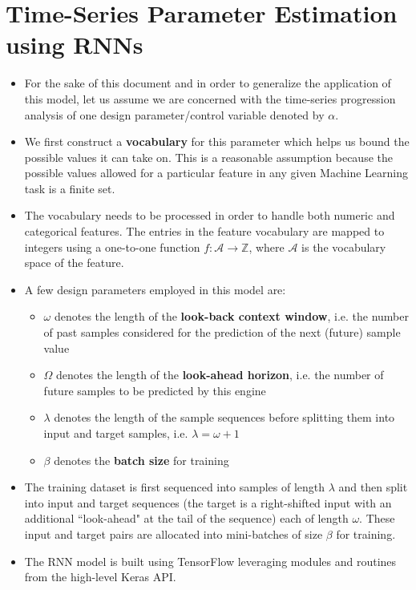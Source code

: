 \documentclass{article}
\begin{document}
\section{Time-Series Parameter Estimation using RNNs}
\begin{itemize}
    \item For the sake of this document and in order to generalize the application of this model, let us assume we are concerned with the time-series progression analysis of one design parameter/control variable denoted by $\alpha$.
    \item We first construct a \textbf{vocabulary} for this parameter which helps us bound the possible values it can take on. This is a reasonable assumption because the possible values allowed for a particular feature in any given Machine Learning task is a finite set.
    \item The vocabulary needs to be processed in order to handle both numeric and categorical features. The entries in the feature vocabulary are mapped to integers using a one-to-one function $f: \mathcal{A} \rightarrow \mathbb{Z}$, where $\mathcal{A}$ is the vocabulary space of the feature.
    \item A few design parameters employed in this model are:
    \begin{itemize}
        \item $\omega$ denotes the length of the \textbf{look-back context window}, i.e. the number of past samples considered for the prediction of the next (future) sample value
        \item $\Omega$ denotes the length of the \textbf{look-ahead horizon}, i.e. the number of future samples to be predicted by this engine
        \item $\lambda$ denotes the length of the sample sequences before splitting them into input and target samples, i.e. $\lambda = \omega + 1$
        \item $\beta$ denotes the \textbf{batch size} for training
    \end{itemize}
    \item The training dataset is first sequenced into samples of length $\lambda$ and then split into input and target sequences (the target is a right-shifted input with an additional ``look-ahead" at the tail of the sequence) each of length $\omega$. These input and target pairs are allocated into mini-batches of size $\beta$ for training.
    \item The RNN model is built using TensorFlow leveraging modules and routines from the high-level Keras API.

\end{itemize}
\end{document}
